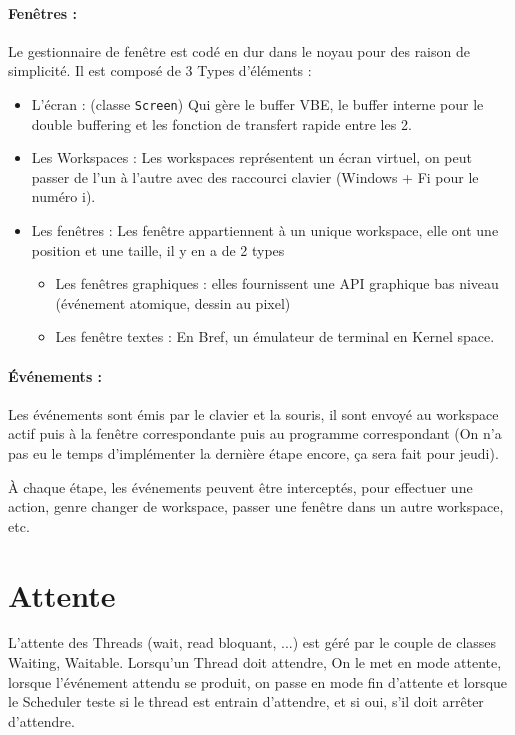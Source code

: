 \documentclass[12pt]{report}
\begin{document}
\paragraph{Fenêtres :} Le gestionnaire de fenêtre est codé en dur dans le noyau pour des raison de
simplicité.
Il est composé de 3 Types d'éléments :
\begin{itemize}
\item L'écran : (classe \verb$Screen$) Qui gère le buffer VBE, le buffer
  interne pour le double buffering et les fonction de transfert rapide entre les
  2.
\item Les Workspaces : Les workspaces représentent un écran virtuel, on peut
  passer de l'un à l'autre avec des raccourci clavier (Windows + Fi pour le numéro
  i).
\item Les fenêtres : Les fenêtre appartiennent à un unique workspace, elle ont
  une position et une taille, il y en a de 2 types
  \begin{itemize}
    \item Les fenêtres graphiques : elles fournissent une API graphique bas
      niveau (événement atomique, dessin au pixel)
    \item Les fenêtre textes : En Bref, un émulateur de terminal en Kernel space.
  \end{itemize}
\end{itemize}

\paragraph{Événements :} Les événements sont émis par le clavier et la souris,
il sont envoyé au workspace actif puis à la fenêtre correspondante puis au
programme correspondant (On n'a pas eu le temps d'implémenter la dernière étape
encore, ça sera fait pour jeudi).

À chaque étape, les événements peuvent être interceptés, pour effectuer une
action, genre changer de workspace, passer une fenêtre dans un autre workspace, etc.

\section{Attente}

L'attente des Threads (wait, read bloquant, ...) est géré par le couple de
classes Waiting, Waitable. Lorsqu'un Thread doit attendre, On le met en mode
attente, lorsque l'événement attendu se produit, on passe en mode fin d'attente
et lorsque le Scheduler teste si le thread est entrain d'attendre, et si oui,
s'il doit arrêter d'attendre. 
\end{document}
